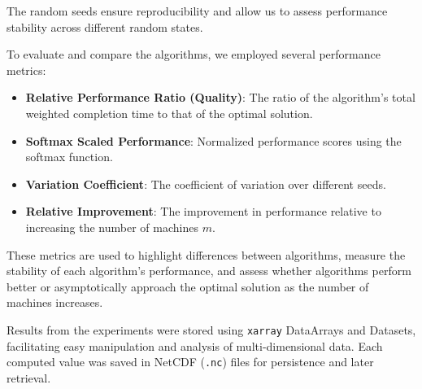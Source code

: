 The random seeds ensure reproducibility and allow us to assess performance stability across different random states.

To evaluate and compare the algorithms, we employed several performance metrics:

\begin{itemize}
    \item \textbf{Relative Performance Ratio (Quality)}: The ratio of the algorithm's total weighted completion time to that of the optimal solution.
    \item \textbf{Softmax Scaled Performance}: Normalized performance scores using the softmax function.
    \item \textbf{Variation Coefficient}: The coefficient of variation over different seeds.
    \item \textbf{Relative Improvement}: The improvement in performance relative to increasing the number of machines $m$.
\end{itemize}

These metrics are used to highlight differences between algorithms, measure the stability of each algorithm's performance, and assess whether algorithms perform better or asymptotically approach the optimal solution as the number of machines increases.

Results from the experiments were stored using \texttt{xarray} DataArrays and Datasets, facilitating easy manipulation and analysis of multi-dimensional data. Each computed value was saved in NetCDF (\texttt{.nc}) files for persistence and later retrieval.

